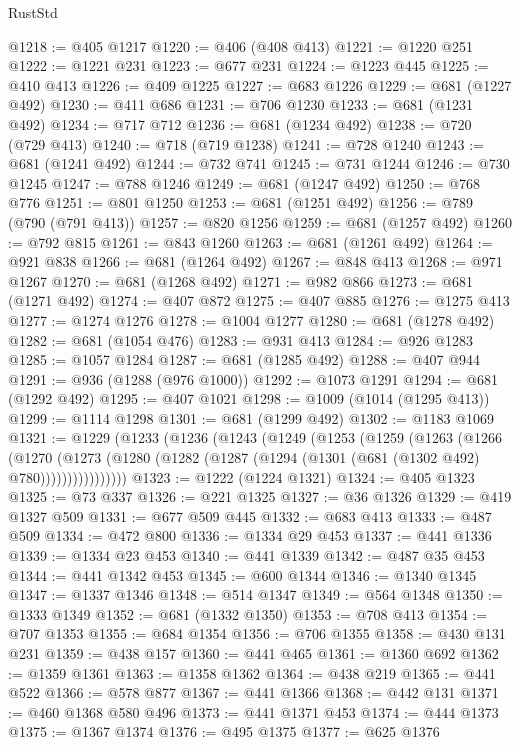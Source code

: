 \begin{lexlean}{RustStd}
\begin{coremodule}
{\begin{coremodule}
{{{{{{{{{{{{{{{{{{{{{{{{{@1218 := @405 @1217
@1220 := @406 (@408 @413)
@1221 := @1220 @251
@1222 := @1221 @231
@1223 := @677 @231
@1224 := @1223 @445
@1225 := @410 @413
@1226 := @409 @1225
@1227 := @683 @1226
@1229 := @681 (@1227 @492)
@1230 := @411 @686
@1231 := @706 @1230
@1233 := @681 (@1231 @492)
@1234 := @717 @712
@1236 := @681 (@1234 @492)
@1238 := @720 (@729 @413)
@1240 := @718 (@719 @1238)
@1241 := @728 @1240
@1243 := @681 (@1241 @492)
@1244 := @732 @741
@1245 := @731 @1244
@1246 := @730 @1245
@1247 := @788 @1246
@1249 := @681 (@1247 @492)
@1250 := @768 @776
@1251 := @801 @1250
@1253 := @681 (@1251 @492)
@1256 := @789 (@790 (@791 @413))
@1257 := @820 @1256
@1259 := @681 (@1257 @492)
@1260 := @792 @815
@1261 := @843 @1260
@1263 := @681 (@1261 @492)
@1264 := @921 @838
@1266 := @681 (@1264 @492)
@1267 := @848 @413
@1268 := @971 @1267
@1270 := @681 (@1268 @492)
@1271 := @982 @866
@1273 := @681 (@1271 @492)
@1274 := @407 @872
@1275 := @407 @885
@1276 := @1275 @413
@1277 := @1274 @1276
@1278 := @1004 @1277
@1280 := @681 (@1278 @492)
@1282 := @681 (@1054 @476)
@1283 := @931 @413
@1284 := @926 @1283
@1285 := @1057 @1284
@1287 := @681 (@1285 @492)
@1288 := @407 @944
@1291 := @936 (@1288 (@976 @1000))
@1292 := @1073 @1291
@1294 := @681 (@1292 @492)
@1295 := @407 @1021
@1298 := @1009 (@1014 (@1295 @413))
@1299 := @1114 @1298
@1301 := @681 (@1299 @492)
@1302 := @1183 @1069
@1321 := @1229
    (@1233
      (@1236
        (@1243
          (@1249
            (@1253
              (@1259
                (@1263
                  (@1266
                    (@1270
                      (@1273
                        (@1280 (@1282 (@1287 (@1294 (@1301 (@681 (@1302 @492) @780))))))))))))))))
@1323 := @1222 (@1224 @1321)
@1324 := @405 @1323
@1325 := @73 @337
@1326 := @221 @1325
@1327 := @36 @1326
@1329 := @419 @1327 @509
@1331 := @677 @509 @445
@1332 := @683 @413
@1333 := @487 @509
@1334 := @472 @800
@1336 := @1334 @29 @453
@1337 := @441 @1336
@1339 := @1334 @23 @453
@1340 := @441 @1339
@1342 := @487 @35 @453
@1344 := @441 @1342 @453
@1345 := @600 @1344
@1346 := @1340 @1345
@1347 := @1337 @1346
@1348 := @514 @1347
@1349 := @564 @1348
@1350 := @1333 @1349
@1352 := @681 (@1332 @1350)
@1353 := @708 @413
@1354 := @707 @1353
@1355 := @684 @1354
@1356 := @706 @1355
@1358 := @430 @131 @231
@1359 := @438 @157
@1360 := @441 @465
@1361 := @1360 @692
@1362 := @1359 @1361
@1363 := @1358 @1362
@1364 := @438 @219
@1365 := @441 @522
@1366 := @578 @877
@1367 := @441 @1366
@1368 := @442 @131
@1371 := @460 @1368 @580 @496
@1373 := @441 @1371 @453
@1374 := @444 @1373
@1375 := @1367 @1374
@1376 := @495 @1375
@1377 := @625 @1376
}}}}}}}}}}}}}}}}}}}}}}}}}
\end{coremodule}}
\end{coremodule}
\end{lexlean}
